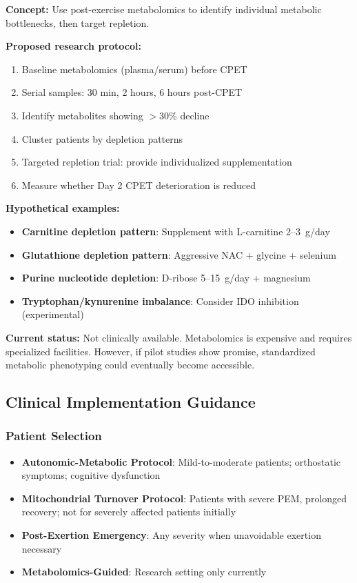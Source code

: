 \textbf{Concept:} Use post-exercise metabolomics to identify individual metabolic bottlenecks, then target repletion.

\textbf{Proposed research protocol:}
\begin{enumerate}
    \item Baseline metabolomics (plasma/serum) before CPET
    \item Serial samples: 30 min, 2 hours, 6 hours post-CPET
    \item Identify metabolites showing $>$30\% decline
    \item Cluster patients by depletion patterns
    \item Targeted repletion trial: provide individualized supplementation
    \item Measure whether Day 2 CPET deterioration is reduced
\end{enumerate}

\textbf{Hypothetical examples:}
\begin{itemize}
    \item \textbf{Carnitine depletion pattern}: Supplement with L-carnitine 2--3~g/day
    \item \textbf{Glutathione depletion pattern}: Aggressive NAC + glycine + selenium
    \item \textbf{Purine nucleotide depletion}: D-ribose 5--15~g/day + magnesium
    \item \textbf{Tryptophan/kynurenine imbalance}: Consider IDO inhibition (experimental)
\end{itemize}

\textbf{Current status:} Not clinically available. Metabolomics is expensive and requires specialized facilities. However, if pilot studies show promise, standardized metabolic phenotyping could eventually become accessible.

\subsection{Clinical Implementation Guidance}

\subsubsection{Patient Selection}

\begin{itemize}
    \item \textbf{Autonomic-Metabolic Protocol}: Mild-to-moderate patients; orthostatic symptoms; cognitive dysfunction
    \item \textbf{Mitochondrial Turnover Protocol}: Patients with severe PEM, prolonged recovery; not for severely affected patients initially
    \item \textbf{Post-Exertion Emergency}: Any severity when unavoidable exertion necessary
    \item \textbf{Metabolomics-Guided}: Research setting only currently
\end{itemize}

